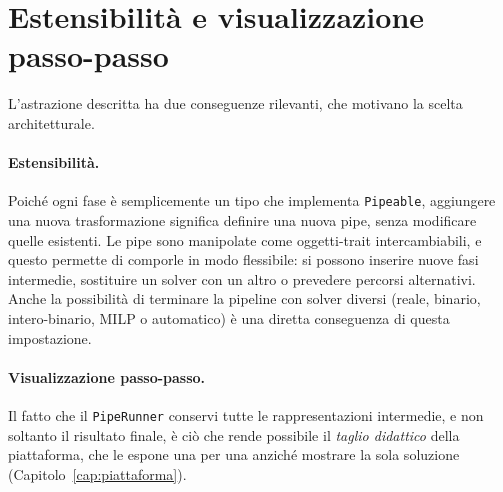 \section{Estensibilità e visualizzazione passo-passo}
\label{sec:estensibilita}

L'astrazione descritta ha due conseguenze rilevanti, che motivano la scelta
architetturale.

\paragraph{Estensibilità.}
Poiché ogni fase è semplicemente un tipo che implementa \texttt{Pipeable},
aggiungere una nuova trasformazione significa definire una nuova pipe, senza
modificare quelle esistenti. Le pipe sono manipolate come oggetti-trait
intercambiabili, e questo permette di comporle in modo flessibile: si possono
inserire nuove fasi intermedie, sostituire un solver con un altro o prevedere
percorsi alternativi. Anche la possibilità di terminare la pipeline con solver
diversi (reale, binario, intero-binario, MILP o automatico) è una diretta
conseguenza di questa impostazione.

\paragraph{Visualizzazione passo-passo.}
Il fatto che il \texttt{PipeRunner} conservi tutte le rappresentazioni intermedie,
e non soltanto il risultato finale, è ciò che rende possibile il \emph{taglio
didattico} della piattaforma, che le espone una per una anziché mostrare la sola
soluzione (Capitolo~\ref{cap:piattaforma}).
